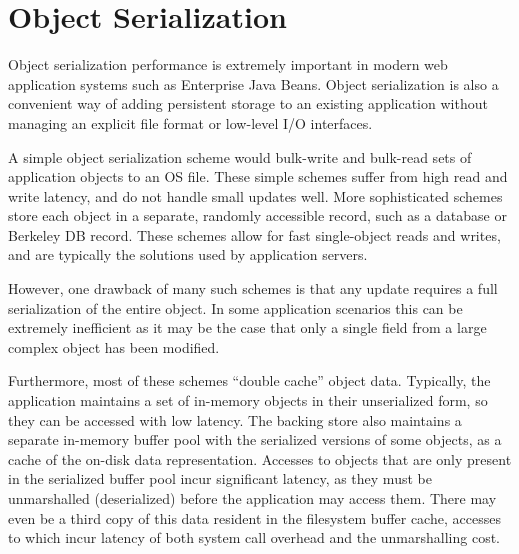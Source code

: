 \documentclass[10pt,letterpaper,twocolumn,english]{article}
\begin{document}


\section{Object Serialization}
\label{OASYS}

Object serialization performance is extremely important in modern web
application systems such as Enterprise Java Beans.  Object
serialization is also a convenient way of adding persistent storage to
an existing application without managing an explicit file format or
low-level I/O interfaces.

A simple object serialization scheme would bulk-write and bulk-read
sets of application objects to an OS file.  These simple
schemes suffer from high read and write latency, and do not handle
small updates well.  More sophisticated schemes store each object in a
separate, randomly accessible record, such as a database  or
 Berkeley DB record.  These schemes allow for fast single-object reads and writes, and are typically the solutions used by
application servers.

However, one drawback of many such schemes is that any update requires
a full serialization of the entire object. In some application
scenarios this can be extremely inefficient as it may be the case
that only a single field from a large complex object has been
modified.

Furthermore, most of these schemes ``double cache'' object
data.  Typically, the application maintains a set of in-memory
objects in their unserialized form, so they can be accessed with low latency.
The backing store also
maintains a separate in-memory buffer pool with the serialized versions of
some objects, as a cache of the on-disk data representation.
Accesses to objects that are only present in the serialized buffer
pool incur significant latency, as they must be unmarshalled (deserialized)
before the application may access them.  
There may even be a third copy of this data resident in the filesystem 
buffer cache, accesses to which incur latency of both system call overhead and
the unmarshalling cost.
\end{document}
